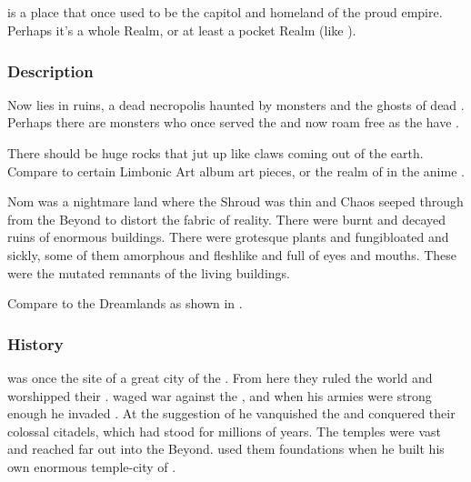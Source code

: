 \subsection{\Nom}
\index{\Nom}
\Nom is a place that once used to be the capitol and homeland of the proud \draconic{} empire. 
Perhaps it's a whole Realm, or at least a pocket Realm (like ). 





\subsubsection{Description}
Now \Nom lies in ruins, a dead necropolis haunted by monsters and the ghosts of dead \dragons. 
Perhaps there are monsters who once served the \dragons{} and now roam free as the \dragons{} have . 

There should be huge rocks that jut up like claws coming out of the earth. 
Compare to certain Limbonic Art album art pieces, or the realm of \Juujinkai{} in the anime \emph{\Urotsukidouji}. 

Nom was a nightmare land where the Shroud was thin and Chaos seeped through from the Beyond to distort the fabric of reality.
There were burnt and decayed ruins of enormous buildings.
There were grotesque plants and fungi\dash bloated and sickly, some of them amorphous and fleshlike and full of eyes and mouths. 
These were the mutated remnants of the living buildings. 

Compare to the Dreamlands as shown in \cite{MichaelNelson:FallofCthulhuII}. 





\subsubsection{History}
\Nom was once the site of a great city of the .
From here they ruled the world and worshipped their .
 waged war against the \shugul, and when his armies were strong enough he invaded \Nom.
At the suggestion of  he vanquished the \shugul and conquered their colossal citadels, which had stood for millions of years.
The \shugul temples were vast and reached far out into the Beyond.
\Sethicus used them foundations when he built his own enormous temple-city of .

